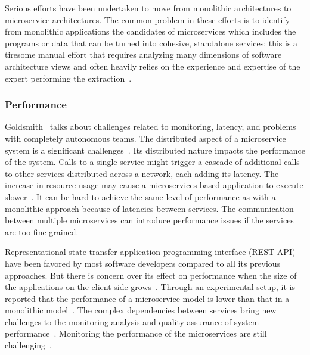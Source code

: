 \par Serious efforts have been undertaken to move from monolithic architectures to microservice architectures. The common problem in these efforts is to identify from monolithic applications the candidates of microservices which includes the programs or data that can be turned into cohesive, standalone services; this is a tiresome manual effort that requires analyzing many dimensions of software architecture views and often heavily relies on the experience and expertise of the expert performing the extraction~\cite{Kamimura2018}\cite{selmadji2020}.

\subsubsection{Performance}%

Goldsmith~\cite{Kevin2015} talks about challenges related to monitoring, latency, and problems with completely autonomous teams. The distributed aspect of a microservice system is a significant challenges~\cite{Matt2016}. Its distributed nature impacts the performance of the system. Calls to a single service might trigger a cascade of additional calls to other services distributed across a network, each adding its latency. The increase in resource usage may cause a microservices-based application to execute slower~\cite{Etsy, Netflix}. It can be hard to achieve the same level of performance as with a monolithic approach because of latencies between services. The communication between multiple microservices can introduce performance issues if the services are too fine-grained.  

\par Representational state transfer application programming interface (REST API) have been favored by most software developers compared to all its previous approaches. But there is concern over its effect on performance when the size of the applications on the client-side grows~\cite{Ghebremicael2017}. Through an experimental setup, it is reported that the performance of a microservice model is lower than that in a monolithic model~\cite{Johansson2019}. The complex dependencies between services bring new challenges to the monitoring analysis and quality assurance of system performance~\cite{Zhihui2020}. Monitoring the performance of the microservices are still challenging~\cite{Saman2017, Venugopal2017}. 

